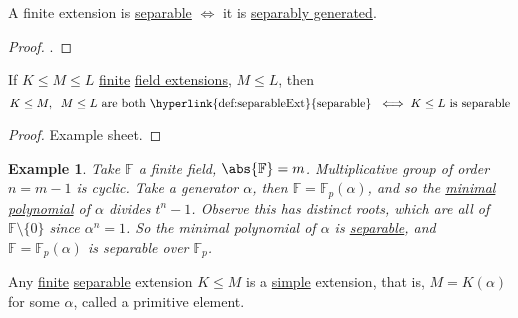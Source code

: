 \documentclass{article}
\newtheorem{nexample}[nthm]{Example}
\newcommand{\F}{\mathbb{F}}
\begin{document}

\begin{ncor}\label{cor:2.14}
    A finite extension is \hyperlink{def:separableExt}{separable} $\iff$ it is \hyperlink{def:separableGen}{separably generated}.
\end{ncor}

\begin{proof}
    .
\end{proof}

\begin{nlemma}\label{lem:2.15}
    If $K \leq M \leq L$ \hyperlink{def:degreeOfFieldExt}{finite} \hyperlink{def:fieldExt}{field extensions}, $M \leq L$, then
    \begin{equation*}
        K \leq M, \; \; M \leq L \text{ are both \hyperlink{def:separableExt}{separable} } \iff K \leq L \text{ is separable}
    \end{equation*}
\end{nlemma}

\begin{proof}
    Example sheet.
\end{proof}

\begin{nexample}
    Take $\F$ a finite field, $\abs{\F} = m$. Multiplicative group of order $n = m - 1$ is cyclic.
    Take a generator $\alpha$, then $\F = \F_p(\alpha)$, and so the \hyperlink{def:minimalPoly}{minimal polynomial} of $\alpha$ divides $t^n - 1$.
    Observe this has distinct roots, which are all of $\F \setminus \{0\}$ since $\alpha^n = 1$.
    So the minimal polynomial of $\alpha$ is \hyperlink{def:separablePoly}{separable}, and $\F = \F_p(\alpha)$ is separable over $\F_p$.
\end{nexample}


\begin{nthm}\label{thm:2.17}
    Any \hyperlink{def:degreeOfFieldExt}{finite} \hyperlink{def:separableExt}{separable} extension $K \leq M$ is a \hyperlink{def:genField}{simple} extension, that is, $M = K(\alpha)$ for some $\alpha$, called a primitive element.
\end{nthm}
\end{document}
